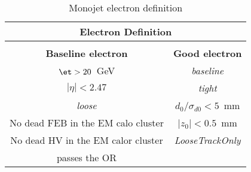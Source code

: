\begin{table}[!th]
  \centering
  \begin{tabular}{cc}
    \multicolumn{2}{c}{Electron Definition} \\
    \hline \hline \\
    \textbf{Baseline electron} & \textbf{Good electron} \\
    \hline
    $\et > 20$~GeV & \emph{baseline} \\
    $|\eta| < 2.47$ & \emph{tight} \\
    \emph{loose} & $d_0 / \sigma_{d0} < 5$~mm \\
    No dead FEB in the EM calo cluster & $|z_0| < 0.5$~mm \\
    No dead HV in the EM calor cluster & \emph{LooseTrackOnly} \\
    passes the OR & \\
    \hline \hline
  \end{tabular}
  \caption{Monojet electron definition}
  \label{tab:ele_def}
\end{table}
